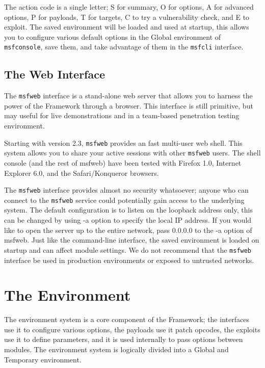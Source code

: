 \documentclass{report}
\begin{document}
\par
The action code is a single letter; S for summary, O for options, A for advanced
options, P for payloads, T for targets, C to try a vulnerability check, and E to
exploit. The saved environment will be loaded and used at startup, this allows
you to configure various default options in the Global environment of
\texttt{msfconsole}, save them, and take advantage of them in the
\texttt{msfcli} interface. 


    \section{The Web Interface}
    \label{STARTED-WEB}
\par
The \texttt{msfweb} interface is a stand-alone web server that allows
you to harness the power of the Framework through a browser. This interface 
is still primitive, but may useful for live demonstrations and in a team-based 
penetration testing environment.

\par
Starting with version 2.3, \texttt{msfweb} provides an fast multi-user web shell. This 
system allows you to share your active sessions with other \texttt{msfweb} users. The
shell console (and the rest of msfweb) have been tested with Firefox 1.0, Internet Explorer 6.0,
and the Safari/Konqueror browsers. 

\par
The \texttt{msfweb} interface provides almost no security whatsoever; anyone who can connect 
to the \texttt{msfweb} service could potentially gain access to the underlying system. 
The default configuration is to listen on the loopback address only, this can be
changed by using -a option to specify the local IP address. If you would like to open the
server up to the entire network, pass 0.0.0.0 to the -a option of msfweb. Just like the 
command-line interface, the saved environment is loaded on startup and can affect module 
settings. We do not recommend that the \texttt{msfweb} interface be used in production 
environments or exposed to untrusted networks. 


\pagebreak
\chapter{The Environment}

\par
The environment system is a core component of the Framework; the interfaces use
it to configure various options, the payloads use it patch opcodes, the exploits
use it to define parameters, and it is used internally to pass options between
modules. The environment system is logically divided into a Global and Temporary environment.  
\end{document}
